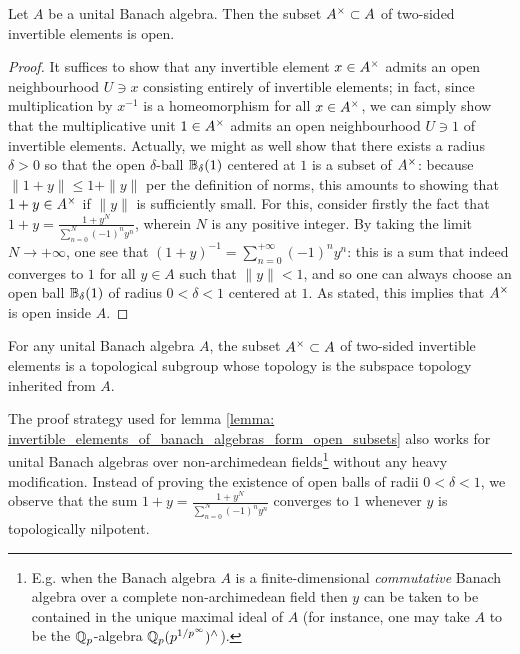             \begin{lemma} \label{lemma: invertible_elements_of_banach_algebras_form_open_subsets}
                Let $A$ be a unital Banach algebra. Then the subset $A^{\x} \subset A$ of two-sided invertible elements is open.
            \end{lemma}
                \begin{proof}
                    It suffices to show that any invertible element $x \in A^{\x}$ admits an open neighbourhood $U \ni x$ consisting entirely of invertible elements; in fact, since multiplication by $x^{-1}$ is a homeomorphism for all $x \in A^{\x}$, we can simply show that the multiplicative unit $1 \in A^{\x}$ admits an open neighbourhood $U \ni 1$ of invertible elements. Actually, we might as well show that there exists a radius $\delta > 0$ so that the open $\delta$-ball $\mathbb{B}_{\delta}(1)$ centered at $1$ is a subset of $A^{\x}$: because $\|1 + y\| \leq 1 + \|y\|$ per the definition of norms, this amounts to showing that $1 + y \in A^{\x}$ if $\|y\|$ is sufficiently small. For this, consider firstly the fact that $1 + y = \frac{1 + y^N}{\sum_{n = 0}^N (-1)^n y^n}$, wherein $N$ is any positive integer. By taking the limit $N \to +\infty$, one see that $(1 + y)^{-1} = \sum_{n = 0}^{+\infty} (-1)^n y^n$: this is a sum that indeed converges to $1$ for all $y \in A$ such that $\|y\| < 1$, and so one can always choose an open ball $\mathbb{B}_{\delta}(1)$ of radius $0 < \delta < 1$ centered at $1$. As stated, this implies that $A^{\x}$ is open inside $A$.
                \end{proof}
            \begin{corollary}
                For any unital Banach algebra $A$, the subset $A^{\x} \subset A$ of two-sided invertible elements is a topological subgroup whose topology is the subspace topology inherited from $A$. 
            \end{corollary}
            \begin{remark}
                The proof strategy used for lemma \ref{lemma: invertible_elements_of_banach_algebras_form_open_subsets} also works for unital Banach algebras over non-archimedean fields\footnote{E.g. when the Banach algebra $A$ is a finite-dimensional \textit{commutative} Banach algebra over a complete non-archimedean field then $y$ can be taken to be contained in the unique maximal ideal of $A$ (for instance, one may take $A$ to be the $\mathbb{Q}_p$-algebra $\mathbb{Q}_p(p^{1/p^{\infty}})^{\wedge}$).} without any heavy modification. Instead of proving the existence of open balls of radii $0 < \delta < 1$, we observe that the sum $1 + y = \frac{1 + y^N}{\sum_{n = 0}^N (-1)^n y^n}$ converges to $1$ whenever $y$ is topologically nilpotent. 
            \end{remark}
